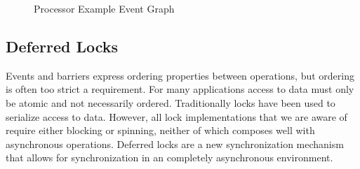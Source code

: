 \begin{figure}
\centering
{}
\vspace{-2mm}
\caption{Processor Example Event Graph\label{fig:procevents}}
\vspace{-4mm}
\end{figure}

\subsection{Deferred Locks}
\label{subsec:locks}

Events and barriers express ordering properties between operations, but 
ordering is often too strict a requirement.  For many applications access to data must only be atomic and
not necessarily ordered.  Traditionally locks have been used to serialize access to
data.  However, all lock implementations that we are aware of require either blocking
or spinning, neither of which composes well with asynchronous operations.
Deferred locks are a new synchronization mechanism that allows for synchronization
in an completely asynchronous environment.  

